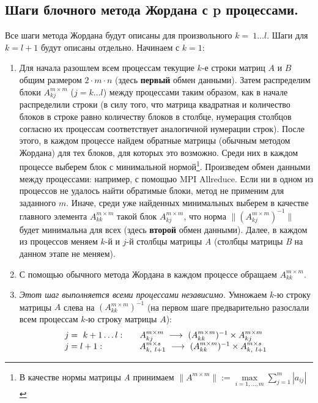 \documentclass[14pt,a4paper, openany]{article}
\begin{document}
\subsection{Шаги блочного метода Жордана с p процессами.}
\indent Все шаги метода Жордана будут описаны для произвольного $ k =\ 1 \ldots l $. Шаги для $ k = l+1 $ будут описаны отдельно. Начинаем с $ k = 1 $:
\begin{enumerate}
	\item Для начала разошлем всем процессам текущие $k$-е строки матриц $A$ и $B$ общим размером $2\cdot m\cdot n$ (здесь \textbf{первый} обмен данными). Затем распределим блоки $A_{kj}^{m \times m}$ ($ j = k \ldots l $) между процессами таким образом, как в начале распределили строки 
	(в силу того, что матрица квадратная и количество блоков в строке равно количеству блоков в столбце, нумерация столбцов согласно их процессам 
	соответствует аналогичной нумерации строк). После этого, в каждом процессе найдем обратные матрицы (обычным методом Жордана) для тех блоков, для которых это возможно. Среди них 
	в каждом процессе выберем блок с минимальной нормой\footnote{ В качестве нормы матрицы \textit{A} принимаем $ \|A^{m \times m} \| := \max\limits_{i = 1,\ldots,m} \sum\limits_{j = 1}^m |a_{ij}| $}. 
	Произведем обмен данными между процессами: например, с помощью MPI Allreduce. Если ни в одном из процессов не удалось найти обратимые блоки, метод не применим для заданного $ m $. Иначе, среди 
	уже найденных минимальных выберем в качестве главного элемента $A_{kk}^{m \times m}$ такой блок $A_{kj}^{m \times m}$, 
	что норма $ \|(A_{kj}^{m \times m})^{-1}\| $ будет минимальна для всех (здесь \textbf{второй} обмен данными). Далее, в каждом из процессов меняем $k$-й и $j$-й столбцы матрицы \textit{A} 
	(столбцы матрицы \textit{B} на данном этапе не меняем). 
	\item С помощью обычного метода Жордана в каждом процессе обращаем $ A_{kk}^{m \times m} $.
	\item 
	\textit{Этот шаг выполняется всеми процессами независимо.}
	Умножаем $k$-ю строку матрицы $A$ слева на $(A_{kk}^{m \times m})^{-1}$ (на первом шаге предварительно разослали всем процессам $k$-ю строку матрицы $A$):
	$$
	\begin{array}{l l}
		j =\ k+1 \ldots l:
		& \quad A_{kj}^{m \times m} \ \longrightarrow \ (A_{kk}^{m \times m})^{-1} \times A_{kj}^{m \times m} \\
		j = l+1:  &  \quad A_{k,\ l+1}^{m \times s} \ \longrightarrow \ (A_{kk}^{m \times m})^{-1} \times A_{k,\ l+1}^{m \times s}
	\end{array}
$$
\end{enumerate}
\end{document}
